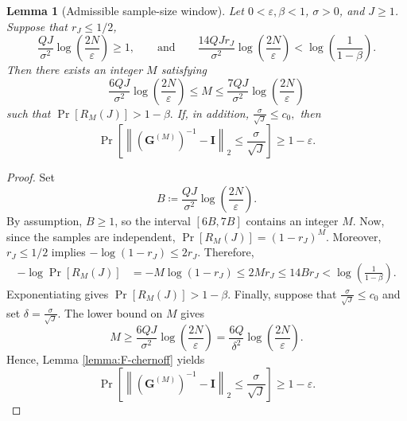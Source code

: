 \documentclass[10pt,a4paper]{amsart}
\newtheorem{lemma}{Lemma}
\DeclareMathOperator{\Prob}{Pr}
\newcommand{\mbf}[1]{\mathbf{#1}}
\begin{document}
\begin{lemma}[Admissible sample-size window]
\label{lemma:admissible-M-window}
Let \(0<\varepsilon,\beta<1\), \(\sigma>0\), and \(J\geq1\). Suppose that
\(r_J\leq1/2\),
\begin{equation}\label{eq:window-compatibility-condition}
    \frac{QJ}{\sigma^2}
    \log\left(\frac{2N}{\varepsilon}\right)
    \geq1,
    \qquad 
    \text{and}
    \qquad
    \frac{14QJr_J}{\sigma^2}
    \log\left(\frac{2N}{\varepsilon}\right)
    <
    \log\left(\frac{1}{1-\beta}\right).
\end{equation}
Then there exists an integer \(M\) satisfying
\begin{equation}\label{eq:window-length-condition}
    \frac{6QJ}{\sigma^2}
    \log\left(\frac{2N}{\varepsilon}\right)
    \leq M
    \leq
    \frac{7QJ}{\sigma^2}
    \log\left(\frac{2N}{\varepsilon}\right)
\end{equation}
such that
\(
    \Prob[R_M(J)]>1-\beta.
\)
If, in addition,
\(
    \frac{\sigma}{\sqrt J}\leq c_0,
\)
then
\[
    \Prob\left[
        \left\|
            \left(\mbf G^{(M)}\right)^{-1}-\mbf I
        \right\|_2
        \leq
        \frac{\sigma}{\sqrt J}
    \right]
    \geq
    1-\varepsilon.
\]
\end{lemma}

\begin{proof}
Set
\[
    B
    \coloneqq
    \frac{QJ}{\sigma^2}
    \log\left(\frac{2N}{\varepsilon}\right).
\]
By assumption, \(B\geq1\), so the interval \([6B,7B]\) contains an integer \(M\). 
Now, since the samples are independent,
\(
    \Prob[R_M(J)]
    =
    (1-r_J)^M.
\)
Moreover, \(r_J\leq1/2\) implies
\(
    -\log(1-r_J)\leq2r_J.
\)
Therefore,
\begin{align*}
    -\log\Prob[R_M(J)]
    &=
    -M\log(1-r_J) 
    \leq
    2Mr_J 
    \leq
    14Br_J 
    <
    \log\left(\frac{1}{1-\beta}\right).
\end{align*}
Exponentiating gives
\(
    \Prob[R_M(J)]>1-\beta.
\)
Finally, suppose that
\(
    \frac{\sigma}{\sqrt J}\leq c_0
\)
and set
\(
    \delta
    =
    \frac{\sigma}{\sqrt J}.
\)
The lower bound on \(M\) gives
\[
    M
    \geq
    \frac{6QJ}{\sigma^2}
    \log\left(\frac{2N}{\varepsilon}\right)
    =
    \frac{6Q}{\delta^2}
    \log\left(\frac{2N}{\varepsilon}\right).
\]
Hence, Lemma \ref{lemma:F-chernoff} yields
\[
    \Prob\left[
        \left\|
            \left(\mbf G^{(M)}\right)^{-1}-\mbf I
        \right\|_2
        \leq
        \frac{\sigma}{\sqrt J}
    \right]
    \geq
    1-\varepsilon.
\]
\end{proof}
\end{document}
